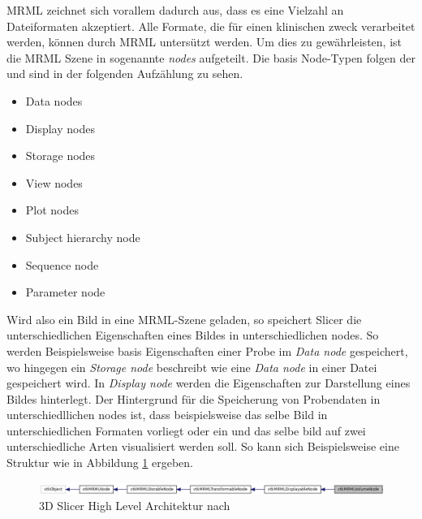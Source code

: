 MRML zeichnet sich vorallem dadurch aus, dass es eine Vielzahl an Dateiformaten
akzeptiert. Alle Formate, die für einen klinischen zweck verarbeitet werden, können
durch MRML untersützt werden. Um dies zu gewährleisten, ist die MRML Szene in sogenannte
\textit{nodes} aufgeteilt. Die basis Node-Typen folgen der \citet{slicer2024}
und sind in der folgenden Aufzählung zu sehen.

\begin{minipage}{0.45\textwidth}
	\begin{itemize}
		\item Data nodes

		\item Display nodes

		\item Storage nodes

		\item View nodes
	\end{itemize}
\end{minipage}
\hfill
\begin{minipage}{0.45\textwidth}
	\begin{itemize}
		\item Plot nodes

		\item Subject hierarchy node

		\item Sequence node

		\item Parameter node
	\end{itemize}
\end{minipage}

Wird also ein Bild in eine MRML-Szene geladen, so speichert Slicer die
unterschiedlichen Eigenschaften eines Bildes in unterschiedlichen nodes. So werden
Beispielsweise basis Eigenschaften einer Probe im \textit{Data node} gespeichert,
wo hingegen ein \textit{Storage node} beschreibt wie eine \textit{Data node} in einer
Datei gespeichert wird. In \textit{Display node} werden die Eigenschaften zur Darstellung
eines Bildes hinterlegt. Der Hintergrund für die Speicherung von Probendaten in
unterschiedllichen nodes ist, dass beispielsweise das selbe Bild in unterschiedlichen
Formaten vorliegt oder ein und das selbe bild auf zwei unterschiedliche Arten visualisiert
werden soll. So kann sich Beispielsweise eine Struktur wie in Abbildung
\ref{fig:3d_slicer_class} ergeben.

\begin{figure}[h]
	\centering
	\includegraphics[width=1\textwidth]{img/slicer_class_index.jpg}
	\caption{3D Slicer High Level Architektur nach \citet{slicer2024}}
	\label{fig:3d_slicer_class}
\end{figure}

